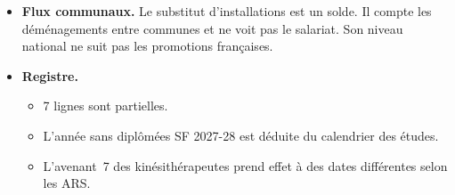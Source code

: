 \documentclass[11pt]{article}
\begin{document}
\begin{itemize}
  \begin{itemize}
    \item L'Annuaire est un instantané de novembre, la DREES compte au 1\textsuperscript{er} janvier. 11,5\,\% des
    activités dentaires n'y ont pas de commune.
    \item Le seuil de 30 est une convention, que seul le banc peut remplacer.
  \end{itemize}
  \item \textbf{Flux communaux.} Le substitut d'installations est un solde. Il compte les déménagements entre
  communes et ne voit pas le salariat. Son niveau national ne suit pas les promotions françaises.
  \item \textbf{Registre.}
  \begin{itemize}
    \item 7 lignes sont partielles.
    \item L'année sans diplômées SF 2027-28 est déduite du calendrier des études.
    \item L'avenant~7 des kinésithérapeutes prend effet à des dates différentes selon les ARS.
  \end{itemize}
\end{itemize}
\end{document}
